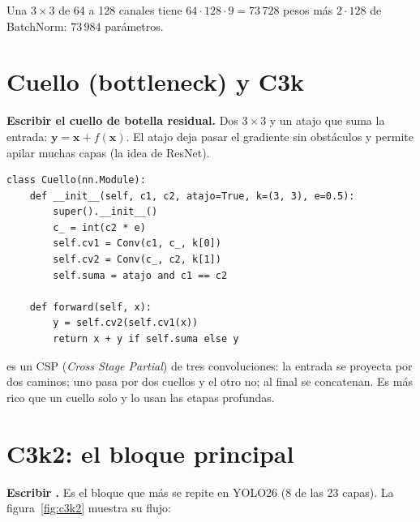 Una  $3\times3$ de 64 a 128 canales tiene $64\cdot128\cdot9 = 73\,728$
pesos más $2\cdot128$ de BatchNorm: $73\,984$ parámetros.

\section{Cuello (bottleneck) y C3k}

 \textbf{Escribir el cuello de botella residual.}
Dos  $3\times3$ y un atajo que suma la entrada:
$\mathbf{y} = \mathbf{x} + f(\mathbf{x})$. El atajo deja pasar el gradiente sin
obstáculos y permite apilar muchas capas (la idea de ResNet).

\begin{lstlisting}[style=py]
class Cuello(nn.Module):
    def __init__(self, c1, c2, atajo=True, k=(3, 3), e=0.5):
        super().__init__()
        c_ = int(c2 * e)
        self.cv1 = Conv(c1, c_, k[0])
        self.cv2 = Conv(c_, c2, k[1])
        self.suma = atajo and c1 == c2

    def forward(self, x):
        y = self.cv2(self.cv1(x))
        return x + y if self.suma else y
\end{lstlisting}

 es un CSP (\emph{Cross Stage Partial}) de tres convoluciones: la
entrada se proyecta por dos caminos; uno pasa por dos cuellos y el otro no; al
final se concatenan. Es más rico que un cuello solo y lo usan las etapas
profundas.

\section{C3k2: el bloque principal}

 \textbf{Escribir .}
Es el bloque que más se repite en YOLO26 (8 de las 23 capas). La
figura~\ref{fig:c3k2} muestra su flujo:

